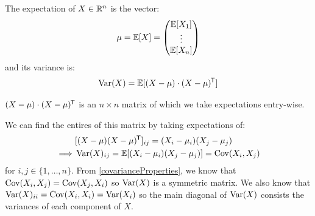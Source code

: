 \documentclass[../main.tex]{subfiles}
\begin{document}
\begin{definition}
  The expectation of $X \in \mathbb{R}^{n}$ is the vector:
  \[
    \mu = \mathbb{E}[X] = \begin{pmatrix}
    \mathbb{E}[X_1] \\
    \vdots \\
    \mathbb{E}[X_n] \\
    \end{pmatrix}
  \]
  and its variance is:
  \[
    \operatorname{Var}(X) = \mathbb{E}[(X - \mu) \cdot (X - \mu)^{{\mkern-1.5mu\mathsf{T}}}]
  \]
\end{definition}
\begin{remark}
  $(X - \mu) \cdot (X - \mu)^{{\mkern-1.5mu\mathsf{T}}}$ is an $n \times n$ matrix of which we take expectations entry-wise.
\end{remark}
We can find the entires of this matrix by taking expectations of:
\begin{align*}
  &[(X - \mu)(X - \mu)^{{\mkern-1.5mu\mathsf{T}}}]_{i j} = (X_i - \mu_i)(X_j - \mu_j) \\
  \implies& \operatorname{Var}(X)_{i j} = \mathbb{E}[(X_i - \mu_i)(X_j - \mu_j)] = \operatorname{Cov}(X_i, X_j)
\end{align*}
for $i, j \in \{1, \ldots, n\}$.
From \cref{covarianceProperties}, we know that $\operatorname{Cov}(X_i, X_j) = \operatorname{Cov}(X_j, X_i)$ so $\operatorname{Var}(X)$ is a symmetric matrix.
We also know that $\operatorname{Var}(X)_{i i} = \operatorname{Cov}(X_i, X_i) = \operatorname{Var}(X_i)$ so the main diagonal of $\operatorname{Var}(X)$ consists the variances of each component of $X$.
\end{document}
